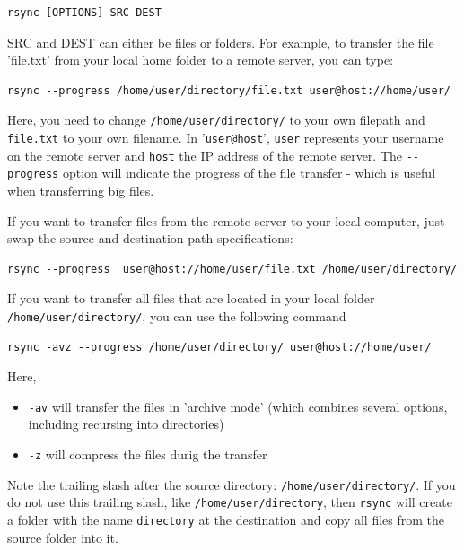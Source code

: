 \documentclass[11pt]{article}
\begin{document}
\begin{verbatim}
rsync [OPTIONS] SRC DEST
\end{verbatim}

SRC and DEST can either be files or folders. For example, to
transfer the file 'file.txt' from your local home folder to a remote
server, you can type:

\begin{verbatim}
rsync --progress /home/user/directory/file.txt user@host://home/user/
\end{verbatim}

Here, you need to change \texttt{/home/user/directory/} to your own filepath and
\texttt{file.txt} to your own filename. In '\texttt{user@host}', \texttt{user}
represents your username on the remote server and \texttt{host} the IP
address of the remote server.  The \texttt{-{}-progress} option will indicate
the progress of the file transfer - which is useful when transferring
big files.

If you want to transfer files from the remote server to your
local computer, just swap the source and destination path
specifications:

\begin{verbatim}
rsync --progress  user@host://home/user/file.txt /home/user/directory/
\end{verbatim}

If you want to transfer all files that are located in your local
folder \texttt{/home/user/directory/}, you can use the following command

\begin{verbatim}
rsync -avz --progress /home/user/directory/ user@host://home/user/
\end{verbatim}

Here,
\begin{itemize}
\item \texttt{-av} will transfer the files in 'archive mode' (which combines
several options, including recursing into directories)
\item \texttt{-z} will compress the files durig the transfer
\end{itemize}

Note the trailing slash after the source directory:
\texttt{/home/user/directory/}. If you do not use this trailing slash, like
\texttt{/home/user/directory}, then \texttt{rsync} will create a folder with the
name \texttt{directory} at the destination and copy all files from the source
folder into it.
\end{document}
